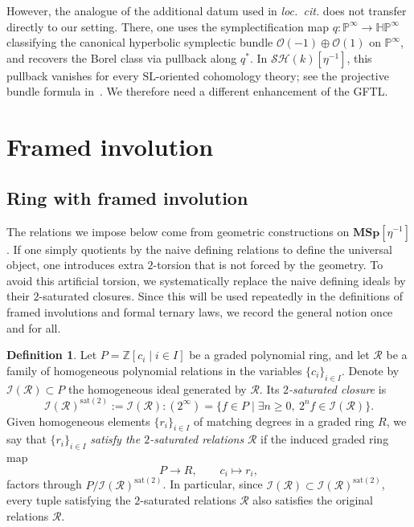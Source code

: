 \documentclass[a4paper]{amsart}
\theoremstyle{plain}
\theoremstyle{definition}
\newtheorem{definition}[subsubsection]{Definition}
\newcommand{\SL}{\mathrm{SL}}
\newcommand{\MSp}{\mathbf{MSp}}
\newcommand{\etainv}{\eta^{-1}}
\newcommand{\MSpetainv}{{\MSp[\etainv]}}
\newcommand{\HP}{\mathbb{HP}}
\newcommand{\HPinf}{\HP^{\infty}}
\newcommand{\SH}{\mathcal{SH}}
\newcommand{\ZZ}{\mathbb{Z}}
\renewcommand{\ge}{\geqslant}
\begin{document}
However, the analogue of the additional datum used in \emph{loc.\ cit.} does not transfer directly to our setting. There, one uses the symplectification map $q:\mathbb{P}^{\infty} \to \HPinf$ classifying the canonical hyperbolic symplectic bundle $\mathcal{O}(-1)\oplus \mathcal{O}(1)$ on $\mathbb{P}^{\infty}$, and recovers the Borel class via pullback along $q^*$. In $\SH(k)[\etainv]$, this pullback vanishes for every $\SL$-oriented cohomology theory; see the projective bundle formula in~\cite{ananyevskiy2016on}. We therefore need a different enhancement of the GFTL.

\section{Framed involution}\label{sec:framed-involution}
\subsection{Ring with framed involution}\label{subsec:framed-involution-ring}
The relations we impose below come from geometric constructions on $\MSpetainv$. If one simply quotients by the naive defining relations to define the universal object, one introduces extra $2$-torsion that is not forced by the geometry. To avoid this artificial torsion, we systematically replace the naive defining ideals by their $2$-saturated closures. Since this will be used repeatedly in the definitions of framed involutions and formal ternary laws, we record the general notion once and for all.

\begin{definition}\label{def:2-saturated-relations}
	Let $P=\ZZ[c_i\mid i\in I]$ be a graded polynomial ring, and let $\mathcal{R}$ be a family of homogeneous polynomial relations in the variables $\{c_i\}_{i\in I}$. Denote by $\mathcal{I}(\mathcal{R})\subset P$ the homogeneous ideal generated by $\mathcal{R}$. Its \emph{$2$-saturated closure} is
	\[
		\mathcal{I}(\mathcal{R})^{\mathrm{sat}(2)}:=\mathcal{I}(\mathcal{R}):(2^\infty)=\{f\in P\mid \exists n\ge0,\ 2^n f\in \mathcal{I}(\mathcal{R})\}.
	\]
	Given homogeneous elements $\{r_i\}_{i\in I}$ of matching degrees in a graded ring $R$, we say that $\{r_i\}_{i\in I}$ \emph{satisfy the $2$-saturated relations} $\mathcal{R}$ if the induced graded ring map
	\[
		P\to R,\qquad c_i\mapsto r_i,
	\]
	factors through $P/\mathcal{I}(\mathcal{R})^{\mathrm{sat}(2)}$.
	In particular, since $\mathcal{I}(\mathcal{R})\subset \mathcal{I}(\mathcal{R})^{\mathrm{sat}(2)}$, every tuple satisfying the $2$-saturated relations $\mathcal{R}$ also satisfies the original relations $\mathcal{R}$.
\end{definition}
\end{document}
